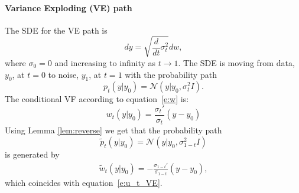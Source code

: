 \documentclass{article}
\newcommand{\too}{\rightarrow}
\def\eqref#1{equation~\ref{#1}}
\def\gN{{\mathcal{N}}}
\begin{document}
\paragraph{Variance Exploding (VE) path}
The SDE for the VE path is 
\begin{equation*}
 dy = \sqrt{\frac{d}{dt}\sigma_t^2}dw,
\end{equation*}
where $\sigma_0=0$ and increasing to infinity as $t\too 1$.
The SDE is moving from data, $y_0$, at $t=0$ to noise, $y_1$, at $t=1$ with the probability path
\begin{equation*}
    p_t(y|y_0) = \gN(y | y_0, \sigma^2_t I).
\end{equation*}
The conditional VF according to \eqref{e:w} is:
\begin{equation*}
    w_t(y|y_0) = \frac{ \sigma_t'}{\sigma_t}(y-y_0)
\end{equation*}
Using Lemma \ref{lem:reverse} we get that the probability path 
\begin{equation*}
    \tilde{p}_t(y|y_0) = \gN(y|y_0, \sigma_{1-t}^2 I)
\end{equation*}
is generated by 
\begin{align*}
    \tilde{w}_t(y|y_0) =-\frac{ \sigma_{1-t}'}{\sigma_{1-t}}(y-y_0),
\end{align*}
which coincides with \eqref{e:u_t_VE}.
\end{document}
